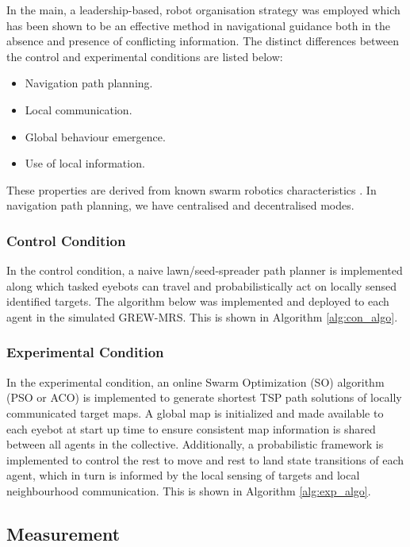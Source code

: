 \documentclass{report}
\begin{document}
In the main, a leadership-based, robot organisation strategy was employed which has been shown \cite{Dyer2008} to be an effective method in navigational guidance both in the absence and presence of conflicting information. The distinct differences between the control and experimental conditions are listed below:
\begin{itemize}
	\item Navigation path planning.
	\item Local communication.
	\item Global behaviour emergence.
	\item Use of local information.
\end{itemize}

These properties are derived from known swarm robotics characteristics \cite{Dorigo2013}. In navigation path planning, we have centralised and decentralised modes.

\subsubsection{Control Condition}
In the control condition, a naive lawn/seed-spreader path planner \cite{Galceran2013} is implemented along which tasked eyebots can travel and probabilistically act on locally sensed identified targets. The algorithm below was implemented and deployed to each agent in the simulated GREW-MRS. This is shown in Algorithm \ref{alg:con_algo}.

\subsubsection{Experimental Condition}
In the experimental condition, an online Swarm Optimization (SO) algorithm (PSO or ACO) is implemented to generate shortest TSP path solutions of locally communicated target maps. A global map is initialized and made available to each eyebot at start up time to ensure consistent map information is shared between all agents in the collective. Additionally, a probabilistic framework is implemented to control the rest to move and rest to land state transitions of each agent, which in turn is informed by the local sensing of targets and local neighbourhood communication. This is shown in Algorithm \ref{alg:exp_algo}.

\subsection{Measurement}
\end{document}
